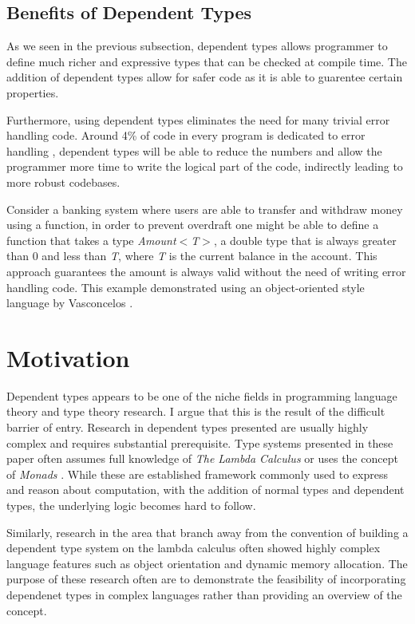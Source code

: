 \documentclass[a4paper,12pt]{report}
\begin{document}
\subsection{Benefits of Dependent Types}
As we seen in the previous subsection, dependent types allows programmer to 
define much richer and expressive types that can be checked at compile time. The 
addition of dependent types allow for safer code as it is able to guarentee certain 
properties. 

\par
Furthermore, using dependent types eliminates the need for many trivial error 
handling code. Around 4\% of code in every program is dedicated to error 
handling \cite{errorHandlingCode}, dependent types will be able to reduce the 
numbers and allow the programmer more time to write the logical part of the 
code, indirectly leading to more robust codebases.

\par
Consider a banking system where users are able to transfer and withdraw 
money using a function, 
in order to prevent overdraft one might be able to define a function that takes 
a type \textit{Amount$<$T$>$}, a double type that is always 
greater than 0 and less than \textit{T}, where \textit{T} is the current balance in the account. 
This approach guarantees the amount is always valid without the need of writing 
error handling code. This example demonstrated using an object-oriented style 
language by Vasconcelos \cite{objOritentedDependentType}.


\section{Motivation}
Dependent types appears to be one of the niche fields in programming language 
theory and type theory research. I argue that this is the result of the 
difficult barrier of entry. Research in dependent types presented are usually 
highly complex and requires substantial prerequisite. Type systems presented in 
these paper often assumes full knowledge of \textit{The Lambda Calculus} 
\cite{lambdaCalculus} or uses the concept of \textit{Monads} \cite{monads}. 
While these are established framework commonly used to express and reason about 
computation, with the addition of normal types and dependent types, the 
underlying logic becomes hard to follow. 

\par
Similarly, research in the area that branch away from the convention of building 
a dependent type system on the lambda calculus often showed highly complex 
language features such as object orientation and dynamic memory allocation. The 
purpose of these research often are to demonstrate the feasibility of 
incorporating dependenet types in complex languages rather than providing an 
overview of the concept. 
\end{document}
